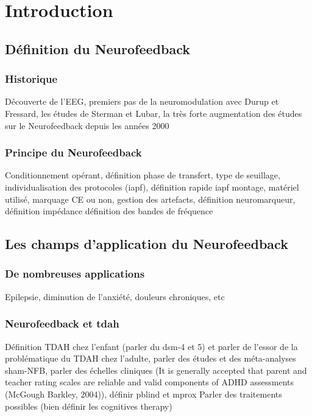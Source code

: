 \chapter{Introduction}


\section{Définition du Neurofeedback}
\subsection{Historique}
Découverte de l’EEG, premiers pas de la neuromodulation avec Durup 
et Fressard, les études de Sterman et Lubar, la très forte augmentation des études sur le Neurofeedback depuis 
les années 2000

\subsection{Principe du Neurofeedback}
Conditionnement opérant, définition phase de transfert, type de seuillage, individualisation des protocoles (iapf), 
définition rapide iapf
montage, matériel utilisé, marquage CE ou non, gestion des artefacts, définition neuromarqueur, définition impédance
définition des bandes de fréquence

\section{Les champs d'application du Neurofeedback}

\subsection{De nombreuses applications}
Epilepsie, diminution de l’anxiété, douleurs chroniques, etc

\subsection{Neurofeedback et \gls{tdah}}
Définition TDAH chez l’enfant (parler du dsm-4 et 5) et parler de l’essor de la problématique du TDAH chez l’adulte, parler des études et des méta-analyses
sham-NFB, parler des échelles cliniques (It is generally accepted that parent and teacher rating scales are reliable and 
valid components of ADHD assessments (McGough  Barkley, 2004)), définir pblind et mprox
Parler des traitements possibles (bien définir les cognitives therapy)

